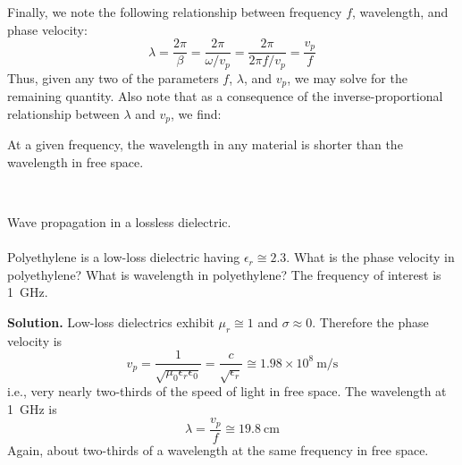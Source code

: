 Finally, we note the following relationship between frequency $f$, wavelength, and phase velocity:
%
\begin{equation}
\lambda = \frac{2\pi}{\beta} 
= \frac{2\pi}{\omega / v_p}
= \frac{2\pi}{2\pi f / v_p}
= \frac{v_p}{f}
\end{equation}
%
Thus, given any two of the parameters $f$, $\lambda$, and $v_p$, we may solve for the remaining quantity.  
Also note that as a consequence of the inverse-proportional relationship between $\lambda$ and $v_p$, we find:
%
\begin{mdframed}[backgroundcolor=yellow!20,nobreak=true] 
At a given frequency, the wavelength in any material is shorter than the wavelength in free space.
\end{mdframed}

~\\ \begin{example} 
\begin{mdframed}[backgroundcolor=brown!20,linecolor=brown!20]\raggedright
Wave propagation in a lossless dielectric.
\\~\\
Polyethylene is a low-loss dielectric having $\epsilon_r \cong 2.3$.
What is the phase velocity in polyethylene?
What is wavelength in polyethylene?
The frequency of interest is 1~GHz.


{\bf Solution.}
Low-loss dielectrics exhibit $\mu_r \cong 1$ and $\sigma\approx 0$.
Therefore the phase velocity is
%
\begin{equation}
v_p = \frac{1}{\sqrt{\mu_0\epsilon_r\epsilon_0 }} = \frac{c}{\sqrt{\epsilon_r}} \cong 1.98 \times 10^8~\mbox{m/s}
\end{equation}
%
i.e., very nearly two-thirds of the speed of light in free space.
The wavelength at 1~GHz is
%
\begin{equation}
\lambda = \frac{v_p}{f} \cong 19.8~\mbox{cm}
\end{equation}
%
Again, about two-thirds of a wavelength at the same frequency in free space.

\end{mdframed}
\end{example}


